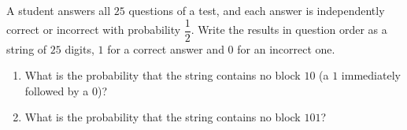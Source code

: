 A student answers all $25$ questions of a test, and each answer is independently correct or incorrect with probability $\dfrac{1}{2}$. Write the results in question order as a string of $25$ digits, $1$ for a correct answer and $0$ for an incorrect one.
\begin{enumerate}
\item[(a)] What is the probability that the string contains no block $10$ (a $1$ immediately followed by a $0$)?
\item[(b)] What is the probability that the string contains no block $101$?
\end{enumerate}

